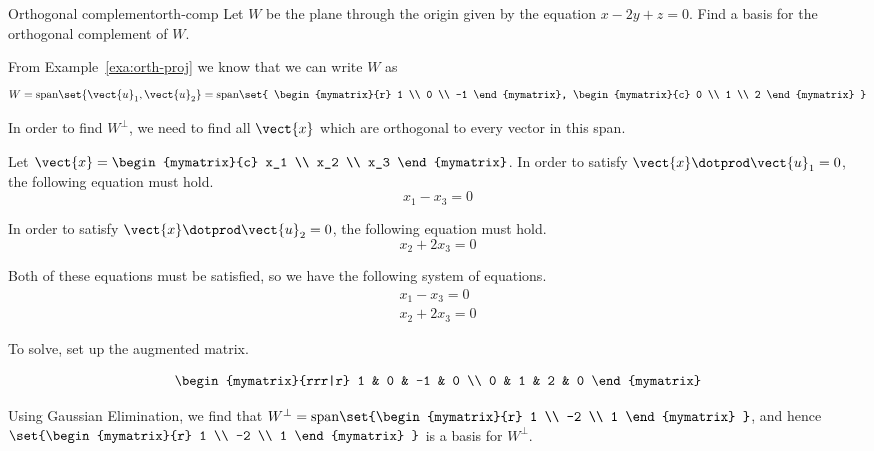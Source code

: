 \begin{example}{Orthogonal complement}{orth-comp}
Let $W$ be the  plane through the origin given by the equation  $x - 2y + z = 0$. Find
a basis for the orthogonal complement of $W$.
\end{example}

\begin{solution}

From Example~\ref{exa:orth-proj} we know that we can write $W$ as
\[
W = \mbox{span} \set{\vect{u}_1, \vect{u}_2 } = \mbox{span}
\set{
\begin{mymatrix}{r}
1 \\
0 \\
-1
\end{mymatrix},
\begin{mymatrix}{c}
0 \\
1 \\
2
\end{mymatrix}
}
\]

In order to find $W^{\perp}$, we need to find all $\vect{x}$ which are orthogonal to every vector in this span.

Let $\vect{x} = \begin{mymatrix}{c}
x_1 \\
x_2 \\
x_3
\end{mymatrix}$.
In order to satisfy $\vect{x} \dotprod \vect{u}_1 = 0$, the following equation must hold.
\[
x_1 - x_3 = 0
\]

In order to satisfy $\vect{x} \dotprod \vect{u}_2 = 0$, the following equation must hold.
\[
x_2 + 2x_3 = 0
\]

Both of these equations must be satisfied, so we have the following system of equations.
\[
\begin{array}{c}
x_1 - x_3 = 0 \\
x_2 + 2x_3 = 0
\end{array}
\]

To solve, set up the augmented matrix.

\[
\begin{mymatrix}{rrr|r}
1 & 0 & -1 & 0 \\
0 & 1 & 2 & 0
\end{mymatrix}
\]

Using Gaussian Elimination, we find that $W^{\perp} = \mbox{span} \set{\begin{mymatrix}{r}
1 \\
-2 \\
1
\end{mymatrix}
}$, and hence
$\set{\begin{mymatrix}{r}
1 \\
-2 \\
1
\end{mymatrix}
}$ is a basis for  $W^{\perp}$.
\end{solution}

